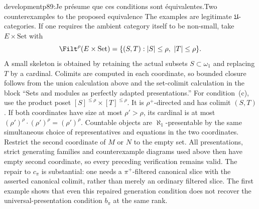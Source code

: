 \begin{dcomment}{development}{p89:Je présume que ces conditions sont équivalentes.}{Two counterexamples to the proposed equivalence}
The examples are legitimate $\mathfrak U$-categories. If one requires the ambient category itself to be non-small, take $E\times\mathrm{Set}$ with
\[
 \Filt^\rho(E\times\mathrm{Set})=
 \{(S,T): |S|\leq\rho,\ |T|\leq\rho\}.
\]
A small skeleton is obtained by retaining the actual subsets $S\subset\omega_1$ and replacing $T$ by a cardinal. Colimits are computed in each coordinate, so bounded closure follows from the union calculation above and the set-colimit calculation in the block ``Sets and modules as perfectly adapted presentations.'' For condition~(c), use the product poset $[S]^{\leq\rho}\times[T]^{\leq\rho}$. It is $\rho^+$-directed and has colimit $(S,T)$. If both coordinates have size at most $\rho'>\rho$, its cardinal is at most $(\rho')^\rho\cdot(\rho')^\rho=(\rho')^\rho$. Countable objects are $\aleph_1$-presentable by the same simultaneous choice of representatives and equations in the two coordinates. Restrict the second coordinate of $M$ or $N$ to the empty set. All presentations, strict generating families and counterexample diagrams used above then have empty second coordinate, so every preceding verification remains valid. The repair to $c_\pi$ is substantial: one needs a $\pi^+$-filtered canonical slice with the asserted canonical colimit, rather than merely an ordinary filtered slice. The first example shows that even this repaired generation condition does not recover the universal-presentation condition $b_\pi$ at the same rank.
\end{dcomment}

